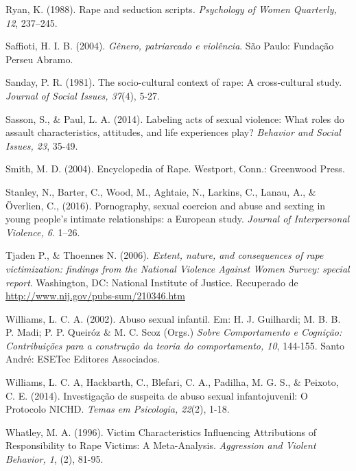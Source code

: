 \hangindent=25pt
\noindent Ryan, K. (1988). Rape and seduction scripts. \textit{Psychology of Women Quarterly, 12}, 237–245.

\hangindent=25pt
\noindent Saffioti, H. I. B. (2004). \textit{Gênero, patriarcado e violência}. São Paulo: Fundação Perseu Abramo.

\hangindent=25pt
\noindent Sanday, P. R. (1981). The socio-cultural context of rape: A cross-cultural study. \textit{Journal of Social Issues, 37}(4), 5-27.

\hangindent=25pt
\noindent Sasson, S., \& Paul, L. A. (2014). Labeling acts of sexual violence: What roles do assault characteristics, attitudes, and life experiences play? \textit{Behavior and Social Issues, 23}, 35-49.

\hangindent=25pt
\noindent Smith, M. D. (2004). Encyclopedia of Rape. Westport, Conn.: Greenwood Press.

\hangindent=25pt
\noindent Stanley, N., Barter, C., Wood, M., Aghtaie, N., Larkins, C., Lanau, A., \& Överlien, C., (2016). Pornography, sexual coercion and abuse and sexting in young people’s intimate relationships: a European study. \textit{Journal of Interpersonal Violence, 6}. 1–26.

\hangindent=25pt
\noindent Tjaden P., \& Thoennes N. (2006). \textit{Extent, nature, and consequences of rape victimization: findings from the National Violence Against Women Survey: special report}. Washington, DC: National Institute of Justice. Recuperado de \url{http://www.nij.gov/pubs-sum/210346.htm}

\hangindent=25pt
\noindent Williams, L. C. A. (2002). Abuso sexual infantil. Em: H. J. Guilhardi; M. B. B. P. Madi; P. P. Queiróz \& M. C. Scoz (Orgs.) \textit{Sobre Comportamento e Cognição: Contribuições para a construção da teoria do comportamento, 10}, 144-155. Santo André: ESETec Editores Associados.

\hangindent=25pt
\noindent Williams, L. C. A, Hackbarth, C., Blefari, C. A., Padilha, M. G. S., \& Peixoto, C. E. (2014). Investigação de suspeita de abuso sexual infantojuvenil: O Protocolo NICHD. \textit{Temas em Psicologia, 22}(2), 1-18.

\hangindent=25pt
\noindent Whatley, M. A. (1996). Victim Characteristics Influencing Attributions of Responsibility to Rape Victims: A Meta-Analysis. \textit{Aggression and Violent Behavior, 1}, (2), 81-95.

